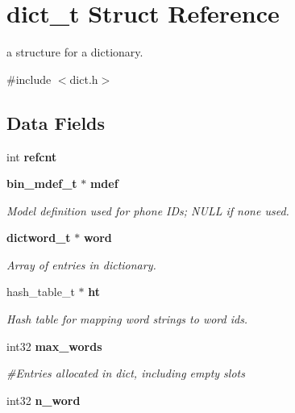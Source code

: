 \section{dict\-\_\-t Struct Reference}
\label{structdict__t}


a structure for a dictionary.  




{\ttfamily \#include $<$dict.\-h$>$}

\subsection*{Data Fields}
\begin{DoxyCompactItemize}
\item 
int {\bfseries refcnt}\label{structdict__t_a5fab69be1205a6c84ec93a4b08924d3c}

\item 
{\bf bin\-\_\-mdef\-\_\-t} $\ast$ {\bf mdef}\label{structdict__t_a3a01eb5a3ebda5652d434be26e0cfdd2}

\begin{DoxyCompactList}\small\item\em Model definition used for phone I\-Ds; N\-U\-L\-L if none used. \end{DoxyCompactList}\item 
{\bf dictword\-\_\-t} $\ast$ {\bf word}\label{structdict__t_a9e6636bbe45936a03381fea430addd31}

\begin{DoxyCompactList}\small\item\em Array of entries in dictionary. \end{DoxyCompactList}\item 
hash\-\_\-table\-\_\-t $\ast$ {\bf ht}\label{structdict__t_a7205aae4fbeef3aaa53f94b6af529af2}

\begin{DoxyCompactList}\small\item\em Hash table for mapping word strings to word ids. \end{DoxyCompactList}\item 
int32 {\bf max\-\_\-words}\label{structdict__t_af6142600cef73f846b58ba9bc36b02ac}

\begin{DoxyCompactList}\small\item\em \#\-Entries allocated in dict, including empty slots \end{DoxyCompactList}\item 
int32 {\bf n\-\_\-word}\label{structdict__t_af00f60319a7025361e291af5addb6b31}


\end{DoxyCompactItemize}
